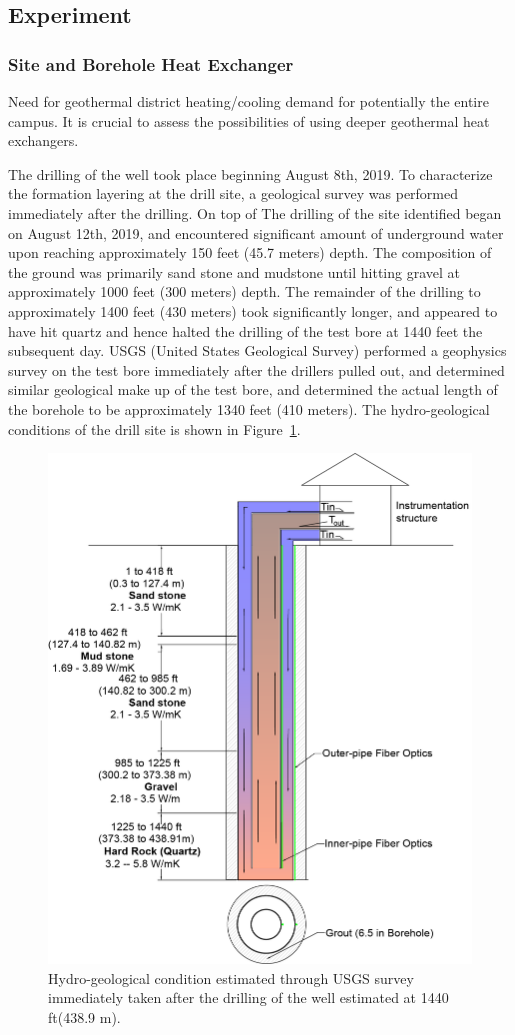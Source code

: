 \subsection{Experiment}

\subsubsection{Site and Borehole Heat Exchanger}
	Need for geothermal district heating/cooling demand for potentially the entire campus. It is crucial to assess the possibilities of using deeper geothermal heat exchangers. 
	
	The drilling of the well took place beginning August 8th, 2019. To characterize the formation layering at the drill site, a geological survey was performed immediately after the drilling. On top of 
	The drilling of the site identified began on August 12th, 2019, and encountered significant amount of underground water upon reaching approximately 150 feet (45.7 meters) depth. The composition of the ground was primarily sand stone and mudstone until hitting gravel at approximately 1000 feet (300 meters) depth. The remainder of the drilling to approximately 1400 feet (430 meters) took significantly longer, and appeared to have hit quartz and hence halted the drilling of the test bore at 1440 feet the subsequent day. USGS (United States Geological Survey) performed a geophysics survey on the test bore immediately after the drillers pulled out, and determined similar geological make up of the test bore, and determined the actual length of the borehole to be approximately 1340 feet (410 meters). The hydro-geological conditions of the drill site is shown in Figure~\ref{fg:hydro}.
	
	\begin{figure}[h!]
	\centering
	\includegraphics[height=0.5\textwidth]{data/geology_cbhe.png}
	\caption{Hydro-geological condition estimated through USGS survey immediately taken after the drilling of the well estimated at 1440 ft(438.9 m).}\label{fg:hydro}	
	\end{figure}
	
